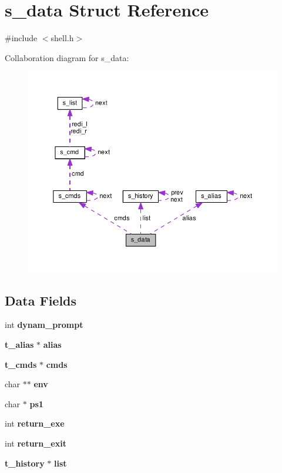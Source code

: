 \section{s\-\_\-data Struct Reference}
\label{structs__data}


{\ttfamily \#include $<$shell.\-h$>$}



Collaboration diagram for s\-\_\-data\-:\nopagebreak
\begin{figure}[H]
\begin{center}
\leavevmode
\includegraphics[width=350pt]{structs__data__coll__graph}
\end{center}
\end{figure}
\subsection*{Data Fields}
\begin{DoxyCompactItemize}
\item 
int {\bf dynam\-\_\-prompt}
\item 
{\bf t\-\_\-alias} $\ast$ {\bf alias}
\item 
{\bf t\-\_\-cmds} $\ast$ {\bf cmds}
\item 
char $\ast$$\ast$ {\bf env}
\item 
char $\ast$ {\bf ps1}
\item 
int {\bf return\-\_\-exe}
\item 
int {\bf return\-\_\-exit}
\item 
{\bf t\-\_\-history} $\ast$ {\bf list}
\end{DoxyCompactItemize}


